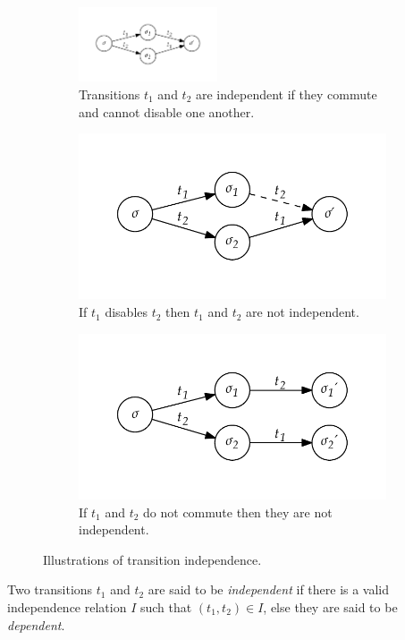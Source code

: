 \documentclass[12pt,a4paper,twoside,openany]{report}
\begin{document}
\begin{figure}
	\centering
	\begin{subfigure}{\textwidth}
		\centering
		\includegraphics*[width=0.45\textwidth]{independence1}
		\caption{Transitions $t_1$ and $t_2$ are independent if
			they commute and cannot disable one another.}
	\end{subfigure}
	\begin{subfigure}{.45\textwidth}
		\centering
		\includegraphics*[width=\textwidth]{independence2}
		\caption{If $t_1$ disables $t_2$ then $t_1$ and $t_2$
			are not independent.}
	\end{subfigure}
	\quad
	\begin{subfigure}{.45\textwidth}
		\centering
		\includegraphics*[width=\textwidth]{independence3}
		\caption{If $t_1$ and $t_2$ do not commute then they
			are not independent.}
	\end{subfigure}
	\caption{Illustrations of transition independence.}
	\label{fig:independence}
\end{figure}
Two transitions $t_1$ and $t_2$ are said to be \emph{independent}
if there is a valid independence relation $I$ such that $(t_1, t_2) \in I$,
else they are said to be \emph{dependent}. \cite{flan05}
\end{document}
